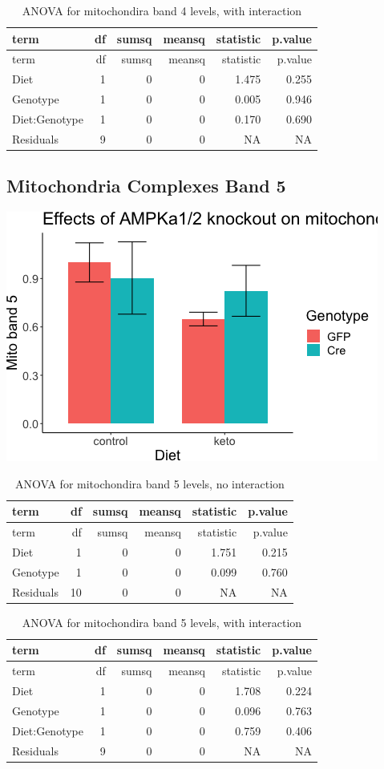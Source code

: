 \documentclass[]{article}
\begin{document}
\begin{longtable}[]{@{}lrrrrr@{}}
\caption{ANOVA for mitochondira band 4 levels, with
interaction}\tabularnewline
\toprule
term & df & sumsq & meansq & statistic & p.value\tabularnewline
\midrule
\endfirsthead
\toprule
term & df & sumsq & meansq & statistic & p.value\tabularnewline
\midrule
\endhead
Diet & 1 & 0 & 0 & 1.475 & 0.255\tabularnewline
Genotype & 1 & 0 & 0 & 0.005 & 0.946\tabularnewline
Diet:Genotype & 1 & 0 & 0 & 0.170 & 0.690\tabularnewline
Residuals & 9 & 0 & 0 & NA & NA\tabularnewline
\bottomrule
\end{longtable}

\hypertarget{mitochondria-complexes-band-5}{%
\subsection{Mitochondria Complexes Band
5}\label{mitochondria-complexes-band-5}}

\includegraphics{figures/mitoband5-barplot-1.png}

\begin{longtable}[]{@{}lrrrrr@{}}
\caption{ANOVA for mitochondira band 5 levels, no
interaction}\tabularnewline
\toprule
term & df & sumsq & meansq & statistic & p.value\tabularnewline
\midrule
\endfirsthead
\toprule
term & df & sumsq & meansq & statistic & p.value\tabularnewline
\midrule
\endhead
Diet & 1 & 0 & 0 & 1.751 & 0.215\tabularnewline
Genotype & 1 & 0 & 0 & 0.099 & 0.760\tabularnewline
Residuals & 10 & 0 & 0 & NA & NA\tabularnewline
\bottomrule
\end{longtable}

\begin{longtable}[]{@{}lrrrrr@{}}
\caption{ANOVA for mitochondira band 5 levels, with
interaction}\tabularnewline
\toprule
term & df & sumsq & meansq & statistic & p.value\tabularnewline
\midrule
\endfirsthead
\toprule
term & df & sumsq & meansq & statistic & p.value\tabularnewline
\midrule
\endhead
Diet & 1 & 0 & 0 & 1.708 & 0.224\tabularnewline
Genotype & 1 & 0 & 0 & 0.096 & 0.763\tabularnewline
Diet:Genotype & 1 & 0 & 0 & 0.759 & 0.406\tabularnewline
Residuals & 9 & 0 & 0 & NA & NA\tabularnewline
\bottomrule
\end{longtable}
\end{document}
